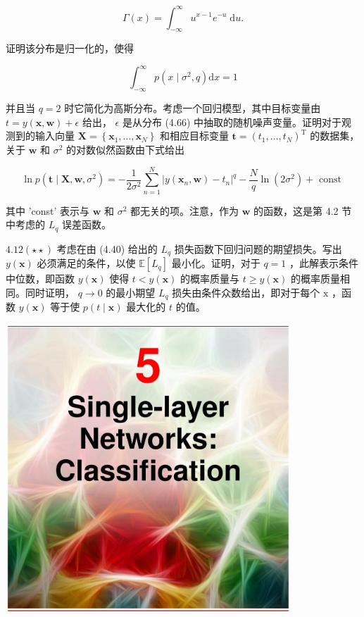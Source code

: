 \documentclass[10pt]{report}
\begin{document}
\[
\Gamma \left( x\right)  = {\int }_{-\infty }^{\infty }{u}^{x - 1}{e}^{-u}\mathrm{\;d}u. \tag{4.67}
\]

证明该分布是归一化的，使得

\[
{\int }_{-\infty }^{\infty }p\left( {x \mid  {\sigma }^{2},q}\right) \mathrm{d}x = 1 \tag{4.68}
\]

并且当 \(q = 2\) 时它简化为高斯分布。考虑一个回归模型，其中目标变量由 \(t = y\left( {\mathbf{x},\mathbf{w}}\right)  + \epsilon\) 给出， \(\epsilon\) 是从分布 (4.66) 中抽取的随机噪声变量。证明对于观测到的输入向量 \(\mathbf{X} = \left\{  {{\mathbf{x}}_{1},\ldots ,{\mathbf{x}}_{N}}\right\}\) 和相应目标变量 \(\mathbf{t} = {\left( {t}_{1},\ldots ,{t}_{N}\right) }^{\mathrm{T}}\) 的数据集，关于 \(\mathbf{w}\) 和 \({\sigma }^{2}\) 的对数似然函数由下式给出

\[
\ln p\left( {\mathbf{t} \mid  \mathbf{X},\mathbf{w},{\sigma }^{2}}\right)  =  - \frac{1}{2{\sigma }^{2}}\mathop{\sum }\limits_{{n = 1}}^{N}{\left| y\left( {\mathbf{x}}_{n},\mathbf{w}\right)  - {t}_{n}\right| }^{q} - \frac{N}{q}\ln \left( {2{\sigma }^{2}}\right)  + \text{ const } \tag{4.69}
\]

其中 'const' 表示与 \(\mathbf{w}\) 和 \({\sigma }^{2}\) 都无关的项。注意，作为 \(\mathbf{w}\) 的函数，这是第 4.2 节中考虑的 \({L}_{q}\) 误差函数。

\({4.12}\left( {\star  \star  }\right)\) 考虑在由 (4.40) 给出的 \({L}_{q}\) 损失函数下回归问题的期望损失。写出 \(y\left( \mathbf{x}\right)\) 必须满足的条件，以使 \(\mathbb{E}\left\lbrack  {L}_{q}\right\rbrack\) 最小化。证明，对于 \(q = 1\) ，此解表示条件中位数，即函数 \(y\left( \mathbf{x}\right)\) 使得 \(t < y\left( \mathbf{x}\right)\) 的概率质量与 \(t \geq  y\left( \mathbf{x}\right)\) 的概率质量相同。同时证明， \(q \rightarrow  0\) 的最小期望 \({L}_{q}\) 损失由条件众数给出，即对于每个 \(\mathrm{x}\) ，函数 \(y\left( \mathbf{x}\right)\) 等于使 \(p\left( {t \mid  \mathbf{x}}\right)\) 最大化的 \(t\) 的值。

\begin{center}
\includegraphics[max width=0.8\textwidth]{images/0194e279-9b28-703a-88f4-c3ac21e2010d_150_474_349_1074_1087_0.jpg}
\end{center}
\hspace*{3em} 
\end{document}
